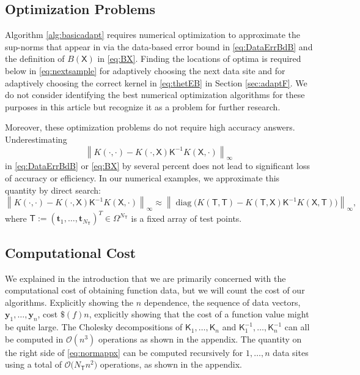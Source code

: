 \documentclass[]{mcom-l}
\theoremstyle{remark}
\DeclareMathOperator{\diag}{diag}
\newcommand{\NT}{{N_{\mT}}}
\newcommand{\mK}{\mathsf{K}}
\newcommand{\mT}{\mathsf{T}}
\newcommand{\mX}{\mathsf{X}}
\newcommand{\by}{{\boldsymbol{y}}}
\newcommand{\bt}{{\boldsymbol{t}}}
\newcommand{\cx}{{\Omega}}
\newcommand{\norm}[2][{}]{\ensuremath{\left \lVert #2 \right \rVert}_{#1}}
\newcommand{\Order}{\mathcal{O}}
\begin{document}
\subsection{Optimization Problems} \label{sec:Optim}

Algorithm \ref{alg:basicadapt} requires numerical optimization to  
approximate the sup-norms that appear in via the data-based error bound in \eqref{eq:DataErrBdB} and the definition of $B(\mX)$ in \eqref{eq:BX}.  Finding the locations of optima is required below in \eqref{eq:nextsample} for adaptively choosing the next data site and for adaptively choosing the correct kernel in \eqref{eq:thetEB} in Section \ref{sec:adaptF}.  We do not consider identifying the best numerical optimization algorithms for these purposes in this article but recognize it as a problem for further research.  

Moreover, these optimization problems do not require high accuracy answers.  Underestimating 
\[\norm[\infty]{K(\cdot,\cdot) - K(\cdot,\mX) \mK^{-1} K(\mX,\cdot)}\]
in  \eqref{eq:DataErrBdB} or  \eqref{eq:BX} by several percent does not lead to significant loss of accuracy or efficiency.  
In our numerical examples, we approximate this quantity by direct search:
\begin{equation} \label{eq:normappx}
\norm[\infty]{K(\cdot,\cdot) - K(\cdot,\mX) \mK^{-1} K(\mX,\cdot)} \approx \norm[\infty]{\diag\bigl(K(\mT,\mT) - K(\mT,\mX) \mK^{-1} K(\mX,\mT) \bigr)},
\end{equation}
where $\mT := (\bt_1, \ldots, \bt_\NT)^T \in \cx^\NT$ is a fixed array of test points.



\subsection{Computational Cost} \label{sec:compCost}
We explained in the introduction that we are primarily concerned with the computational cost of obtaining function data, but we will count the cost of our algorithms.  Explicitly showing the $n$ dependence, the sequence of data vectors, $\by_1, \ldots, \by_n$, cost $\$(f)n$, explicitly showing that the cost of a function value might be quite large.  The Cholesky decompositions of $\mK_1, \ldots, \mK_n$ and $\mK_1^{-1}, \ldots, \mK_n^{-1}$ can all be computed in $\Order(n^3)$ operations as shown in the appendix.  The quantity on the right side of \eqref{eq:normappx} can be computed recursively for $1, \ldots, n$ data sites using a total of $\Order\bigl( \NT n^2 \bigr)$ operations, as shown in the appendix.  
\end{document}
